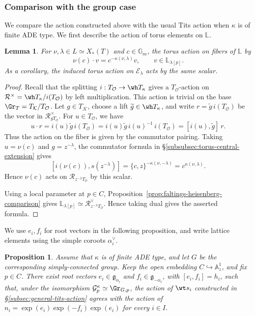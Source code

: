 \documentclass{amsart}
\numberwithin{equation}{section}
\numberwithin{figure}{section}
\newtheorem{lem}[thm]{Lemma}
\newtheorem{prop}[thm]{Proposition}
\theoremstyle{definition}
\theoremstyle{remark}
\renewcommand{\c}[1]{\mathcal{#1}}
\renewcommand{\b}[1]{\mathbb{#1}}
\begin{document}
\subsubsection{Comparison with the group case}

We compare the action constructed above with the usual
Tits action when $\kappa$ is of finite ADE type.
We first describe the action of torus elements
on $\b L$.

\begin{lem}
	\label{lem:torus-faltings-action}
	For $\nu,\lambda\in L\simeq X_*(T)$ and $c\in\b G_m$, the torus action on fibers of $\b L$ by
	\[
	\nu(c)\cdot v=c^{-\kappa(\nu,\lambda)}v,
	\qquad v\in\b L_{\lambda[p]}.
	\]
	As a corollary, the induced torus action on $\c E_\lambda$ acts by the same scalar.
\end{lem}

\begin{proof}
	Recall that the splitting $i:T_\c O\to\wh T_\kappa$
	gives a $T_\c O$-action on $\c R^\times=\wh T_\kappa/i(T_\c O)$
	by left multiplication. This action is trivial on the base	$\Gr_T=T_\c K/T_\c O$.
	Let $g\in T_\c K$, choose a lift
	$\widetilde g\in\wh T_\kappa$, and write
	$r=\widetilde g\,i(T_\c O)$ be the vector in $\c R_{gT_\c O}^\times$.
	For $u\in T_\c O$, we have
	$$	u\cdot r
	=i(u)\widetilde g\,i(T_\c O)
	=i(u)\widetilde g\,i(u)^{-1}\,i(T_\c O)
	=[i(u),\widetilde g]\,r.$$
	Thus the action on the fiber is given by the
	commutator pairing.	Taking $u=\nu(c)$ and $g=z^{-\lambda}$, the commutator
	formula in \S\ref{subsubsec:torus-central-extension}
	gives
	\[
	[i(\nu(c)),s(z^{-\lambda})]
	=\{c,z\}^{-\kappa(\nu,-\lambda)}
	=c^{\kappa(\nu,\lambda)}.
	\]
	Hence $\nu(c)$ acts on $\c R_{z^{-\lambda} T_\c O}$
	by this scalar.
	
	Using a local parameter at $p\in C$,
	Proposition~\ref{prop:faltings-heisenberg-comparison}
	gives $\b L_{\lambda[p]}
	\simeq\c R_{z^{-\lambda}T_\c O}^{\vee}.$
	Hence taking dual gives the asserted formula.
\end{proof}

We use $e_i,f_i$ for root vectors in the following
proposition, and write lattice elements using the
simple coroots $\alpha_i^\vee$.

\begin{prop}
	\label{prop:tits-group-comparison}
	Assume that $\kappa$ is of finite ADE type, and let
	$G$ be the corresponding simply-connected group.
	Keep the open embedding $C\hookrightarrow\b A^1_z$,
	and fix $p\in C$.
	There exist root vectors
	$e_i\in\mathfrak g_{\alpha_i}$ and
	$f_i\in\mathfrak g_{-\alpha_i}$, with
	$[e_i,f_i]=h_i$, such that, under the isomorphism
	$\c G^\kappa_p\simeq\Gr_{G,p}$, the action of
	$\wt s_i$ constructed in
	\S\ref{subsec:general-tits-action}
	agrees with the action of
	$n_i=\exp(e_i)\exp(-f_i)\exp(e_i)$
	for every $i\in I$.
\end{prop}
\end{document}
